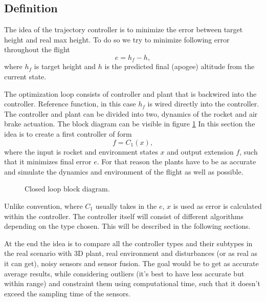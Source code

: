 \subsection{Definition}
The idea of the trajectory controller is to minimize the error between target height and real max height.
To do so we try to minimize following error throughout the flight
\begin{equation}
    e = h_f - h,
\end{equation}
where $h_f$ is target height and $h$ is the predicted final (apogee) altitude from the current state.

The optimization loop consists of controller and plant that is backwired into the controller. Reference
function, in this case $h_f$ is wired directly into the controller. The controller and plant can be divided
into two, dynamics of the rocket and air brake actuation. The block diagram can be visible in figure \ref{fig:1}
In this section the idea is to create a first controller of form
\begin{equation}
    f = C_1(x),
\end{equation}
where the input is rocket and environment states $x$ and output extension $f$, such that it minimizes final
error $e$. For that reason the plants have to be as accurate and simulate the dynamics and environment of the
flight as well as possible.

\begin{figure}[ht]
    \label{fig:1}
    \caption{Closed loop block diagram.}
\end{figure}

Unlike convention, where $C_1$ usually takes in the $e$, $x$ is used as error is calculated within
the controller. The controller itself will consist of different algorithms depending on the type chosen.
This will be described in the following sections.

At the end the idea is to compare all the controller types and their subtypes in the real scenario with
3D plant, real environment and disturbances (or as real as it can get), noisy sensors and sensor fusion.
The goal would be to get as accurate average results, while considering outliers (it's best to have less
accurate but within range) and constraint them using computational time, such that it doesn't exceed the 
sampling time of the sensors.




